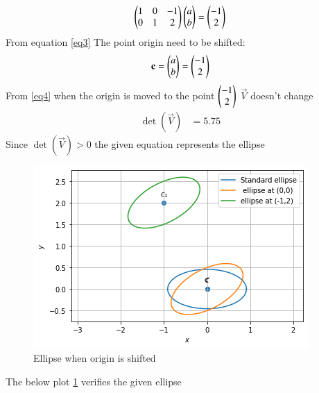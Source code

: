 \documentclass[journal,12pt,twocolumn]{IEEEtran}
\begin{document}
\begin{align}\label{eq3}
\begin{pmatrix}
1& 0& -1\\
0 & 1 & 2\end{pmatrix}
\begin{pmatrix}
a\\b\end{pmatrix}=
\begin{pmatrix}
-1\\2\end{pmatrix}
\end{align}
From equation \eqref{eq3} The point origin need to be shifted:
\begin{align}\label{eq4}
\mathbf{c}=
 \begin{pmatrix}   
 a\\b\end{pmatrix}
 =
 \begin{pmatrix}-1\\2
 \end{pmatrix}
\end{align}
From \eqref{eq4} when the origin is moved to the point $\begin{pmatrix}-1\\2\end{pmatrix}$  $\vec{V}$ doesn't change
\begin{align}
    \det(\vec{V})&=5.75
\end{align}
Since $\det(\vec{V})>0$ the given equation represents the ellipse
\renewcommand{\thefigure}{1}
\begin{figure}[h]
    \centering
    \includegraphics[width=\columnwidth]{Assignment 6.png}
    \caption{Ellipse when origin is shifted}
    \label{Fig :1}
\end{figure}
The below plot \ref{Fig :1} verifies the given ellipse
\end{document}
